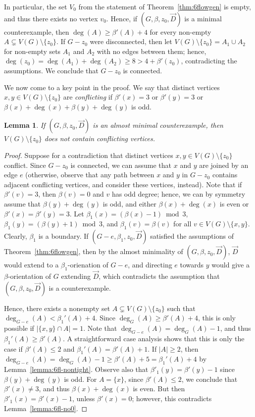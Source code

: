 \documentclass[12pt,twoside,openright,a4paper]{book}
\newtheorem{lemma}[theorem]{Lemma}
\begin{document}
In particular, the set $V_0$ from the statement of Theorem~\ref{thm:6flowgen} is empty, and thus there exists no vertex $v_0$.
Hence, if $(G,\beta,z_0,\vec{D})$ is a minimal counterexample, then $\deg(A)\ge \beta'(A)+4$ for every non-empty $A\subsetneq V(G)\setminus \{z_0\}$.
If $G-z_0$ were disconnected, then let $V(G)\setminus \{z_0\}=A_1\cup A_2$ for non-empty sets $A_1$ and $A_2$ with no edges between them;
hence, $\deg(z_0)=\deg(A_1)+\deg(A_2)\ge 8>4+\beta'(z_0)$, contradicting the assumptions.  We conclude that $G-z_0$ is connected.

We now come to a key point in the proof.  We say that distinct vertices $x,y\in V(G)\setminus\{z_0\}$ are \emph{conflicting} if $\beta'(x)=3$ or $\beta'(y)=3$ or
$\beta(x)+\deg(x)+\beta(y)+\deg(y)$ is odd.
\begin{lemma}\label{lemma:6fl-noconfl}
If $(G,\beta,z_0,\vec{D})$ is an almost minimal counterexample, then $V(G)\setminus\{z_0\}$ does not contain conflicting vertices.
\end{lemma}
\begin{proof}
Suppose for a contradiction that distinct vertices $x,y\in V(G)\setminus\{z_0\}$ conflict.  Since $G-z_0$ is connected, we can
assume that $x$ and $y$ are joined by an edge $e$ (otherwise, observe that any path between $x$ and $y$ in $G-z_0$ contains
adjacent conflicting vertices, and consider these vertices, instead).  Note that if $\beta'(v)=3$, then $\beta(v)=0$ and $v$ has odd degree; hence, we can by symmetry assume
that $\beta(y)+\deg(y)$ is odd, and either $\beta(x)+\deg(x)$ is even or $\beta'(x)=\beta'(y)=3$.
Let $\beta_1(x)=(\beta(x)-1)\bmod 3$, $\beta_1(y)=(\beta(y)+1)\bmod 3$, and $\beta_1(v)=\beta(v)$ for all $v\in V(G)\setminus \{x,y\}$.
Clearly, $\beta_1$ is a boundary.  If $(G-e,\beta_1,z_0,\vec{D})$ satisfied the assumptions of Theorem~\ref{thm:6flowgen}, then by the almost minimality of $(G,\beta,z_0,\vec{D})$,
$\vec{D}$ would extend to a $\beta_1$-orienation of $G-e$, and directing $e$ towards $y$ would give a $\beta$-orientation of $G$ extending $\vec{D}$,
which contradicts the assumption that $(G,\beta,z_0,\vec{D})$ is a counterexample.

Hence, there exists a nonempty set $A\subsetneq V(G)\setminus \{z_0\}$ such that $\deg_{G-e}(A)<\beta_1'(A)+4$.  Since $\deg_G(A)\ge\beta'(A)+4$,
this is only possible if $|\{x,y\}\cap A|=1$.  Note that $\deg_{G-e}(A)=\deg_G(A)-1$, and thus $\beta_1'(A)\ge\beta'(A)$.
A straightforward case analysis shows that this is only the case if $\beta'(A)\le 2$ and $\beta_1'(A)=\beta'(A)+1$.
If $|A|\ge 2$, then $\deg_{G-e}(A)=\deg_G(A)-1\ge \beta'(A)+5=\beta_1'(A)+4$ by Lemma~\ref{lemma:6fl-nontight}.
Observe also that $\beta'_1(y)=\beta'(y)-1$ since $\beta(y)+\deg(y)$ is odd.
For $A=\{x\}$, since $\beta'(A)\le 2$, we conclude that $\beta'(x)\neq 3$, and thus $\beta(x)+\deg(x)$ is even.
But then $\beta'_1(x)=\beta'(x)-1$, unless $\beta'(x)=0$; however, this contradicts Lemma~\ref{lemma:6fl-no0}.
\end{proof}
\end{document}
